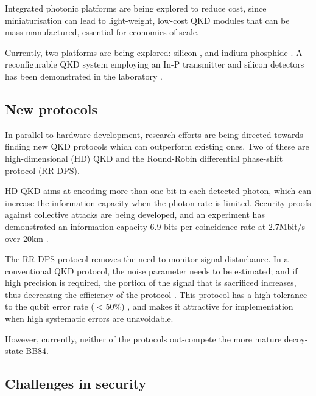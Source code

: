 Integrated photonic platforms are being explored to reduce cost, since miniaturisation can lead to light-weight, low-cost QKD modules that can be mass-manufactured, essential for economies of scale. 

Currently, two platforms are being explored: silicon \cite{bib:lim2014review}, and indium phosphide \cite{bib:smit2014introduction}. A reconfigurable QKD system employing an In-P transmitter and silicon detectors has been demonstrated in the laboratory \cite{bib:sibson2017chip}.

\subsection{New protocols}

In parallel to hardware development, research efforts are being directed towards finding new QKD protocols which can outperform existing ones. Two of these are high-dimensional (HD) QKD and the Round-Robin differential phase-shift protocol (RR-DPS).

HD QKD aims at encoding more than one bit in each detected photon, which can increase the information capacity when the photon rate is limited. Security proofs against collective attacks are being developed, and an experiment has demonstrated an information capacity 6.9 bits per coincidence rate at 2.7Mbit/s over 20km \cite{bib:zhong2015photon}.

The RR-DPS protocol \cite{bib:sasaki2014practical} removes the need to monitor signal disturbance. In a conventional QKD protocol, the noise parameter needs to be estimated; and if high precision is required, the portion of the signal that is sacrificed increases, thus decreasing the efficiency of the protocol \cite{bib:cai2009finite, bib:hayashi2014security}. This protocol has a high tolerance to the qubit error rate ($<50\%$) \cite{bib:xu2015discrete}, and makes it attractive for implementation when high systematic errors are unavoidable.   

However, currently, neither of the protocols out-compete the more mature decoy-state BB84.

\subsection{Challenges in security}


